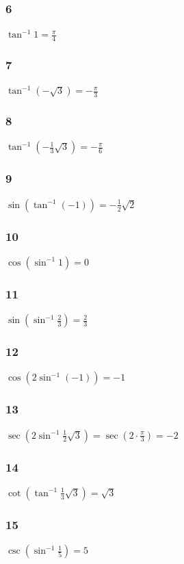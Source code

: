 \documentclass[]{report}
\begin{document}
\subsubsection{6}
$\tan^{-1}1 = \frac{\pi}{4}$
\subsubsection{7}
$\tan^{-1}(-\sqrt{3}) = -\frac{\pi}{3}$
\subsubsection{8}
$\tan^{-1}(-\frac{1}{3}\sqrt{3}) = -\frac{\pi}{6}$
\subsubsection{9}
$\sin(\tan^{-1}(-1)) = -\frac{1}{2}\sqrt{2}$
\subsubsection{10}
$\cos(\sin^{-1}1) = 0$
\subsubsection{11}
$\sin(\sin^{-1}\frac{2}{3}) = \frac{2}{3}$
\subsubsection{12}
$\cos(2\sin^{-1}(-1)) = -1$
\subsubsection{13}
$\sec(2\sin^{-1}\frac{1}{2}\sqrt{3}) = \sec (2 \cdot \frac{\pi}{3}) = -2$
\subsubsection{14}
$\cot(\tan^{-1}\frac{1}{3}\sqrt{3}) = \sqrt{3}$
\subsubsection{15}
$\csc(\sin^{-1}\frac{1}{5}) = 5$
\end{document}
